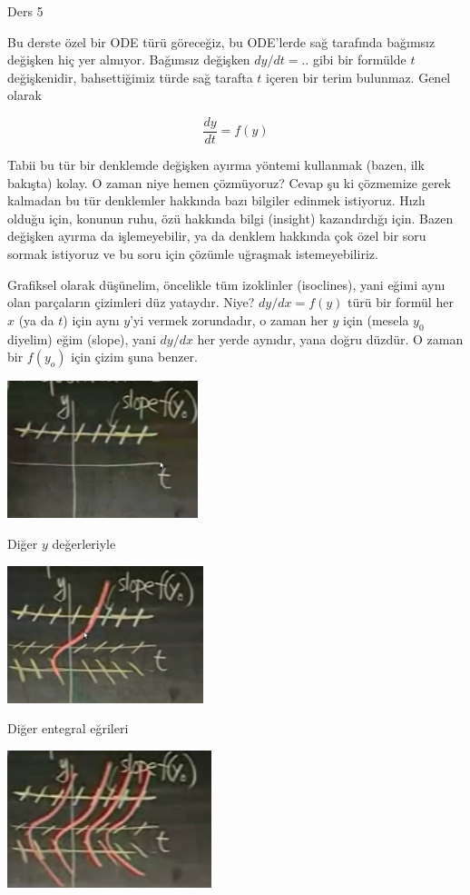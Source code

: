 \documentclass[12pt,fleqn]{article}\usepackage{../../common}
\begin{document}
Ders 5

Bu derste özel bir ODE türü göreceğiz, bu ODE'lerde sağ tarafında bağımsız
değişken hiç yer almıyor. Bağımsız değişken $dy/dt = ..$ gibi bir formülde
$t$ değişkenidir, bahsettiğimiz türde sağ tarafta $t$ içeren bir terim
bulunmaz. Genel olarak

$$ \frac{dy}{dt} = f(y) $$

Tabii bu tür bir denklemde değişken ayırma yöntemi kullanmak (bazen, ilk
bakışta) kolay. O zaman niye hemen çözmüyoruz? Cevap şu ki çözmemize gerek
kalmadan bu tür denklemler hakkında bazı bilgiler edinmek istiyoruz. Hızlı
olduğu için, konunun ruhu, özü hakkında bilgi (insight) kazandırdığı
için. Bazen değişken ayırma da işlemeyebilir, ya da denklem hakkında çok
özel bir soru sormak istiyoruz ve bu soru için çözümle uğraşmak
istemeyebiliriz.

Grafiksel olarak düşünelim, öncelikle tüm izoklinler (isoclines), yani eğimi
aynı olan parçaların çizimleri düz yataydır. Niye? $dy/dx = f(y)$ türü bir formül
her $x$ (ya da $t$) için aynı $y$'yi vermek zorundadır, o zaman her $y$ için
(mesela $y_0$ diyelim) eğim (slope), yani $dy/dx$ her yerde aynıdır, yana doğru
düzdür. O zaman bir $f(y_o)$ için çizim şuna benzer.

\includegraphics[height=4cm]{5_1.png}

Diğer $y$ değerleriyle

\includegraphics[height=4cm]{5_2.png}

Diğer entegral eğrileri

\includegraphics[height=4cm]{5_3.png}
\end{document}
